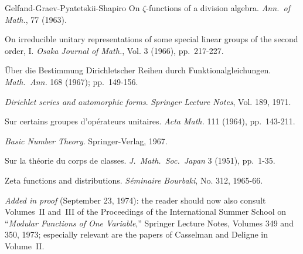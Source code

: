 \begin{thebibliography}{Gelfand-Graev-Pyatetskii-Shapiro}
 On $\zeta$-functions of a division algebra. \emph{Ann.\ of Math.}, 77 (1963).

 On irreducible unitary representations of some special linear groups of the second order, I. \emph{Osaka Journal of Math.}, Vol. 3 (1966), pp.\ 217-227.

 \"Uber die Bestimmung Dirichletscher Reihen durch Funktionalgleichungen. \emph{Math.\ Ann.} 168 (1967); pp.\ 149-156.

 \emph{Dirichlet series and automorphic forms}. \emph{Springer Lecture Notes}, Vol. 189, 1971.

 Sur certains groupes d'op\'erateurs unitaires. \emph{Acta Math.} 111 (1964), pp.\ 143-211.

 \emph{Basic Number Theory}. Springer-Verlag, 1967.

 Sur la th\'eorie du corps de classes. \emph{J.\ Math.\ Soc.\ Japan} 3 (1951), pp.\ 1-35.

 Zeta functions and distributions. \emph{S\'eminaire Bourbaki}, No. 312, 1965-66.

\end{thebibliography}

\medskip
{\small \textit{Added in proof} (September 23, 1974): the reader should now also consult Volumes~II and~III of the Proceedings of the International Summer School on ``\emph{Modular Functions of One Variable},'' Springer Lecture Notes, Volumes 349 and 350, 1973; especially relevant are the papers of Casselman and Deligne in Volume~II.}

